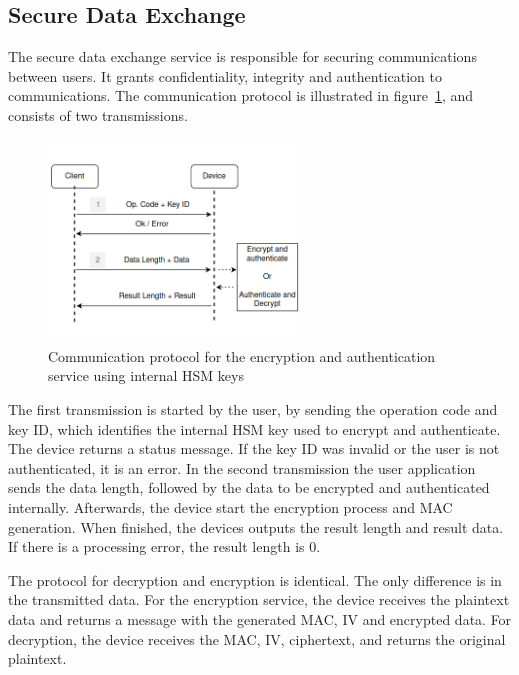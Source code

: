 \subsection{Secure Data Exchange}\label{chap:arch:services:data-exchange}

The secure data exchange service is responsible for securing communications between users. It grants confidentiality, integrity and authentication to communications.
The communication protocol is illustrated in figure~\ref{fig:protocol:data-exchange}, and consists of two transmissions.
\begin{figure}[h!]
	\centering
	\includegraphics[width=0.60\textwidth]{./Images/data-exchange.png}
	\caption{Communication protocol for the encryption and authentication service using internal HSM keys}
	\label{fig:protocol:data-exchange}
\end{figure}

The first transmission is started by the user, by sending the operation code and key ID, which identifies the internal \ac{HSM} key used to encrypt and authenticate.
The device returns a status message. If the key ID was invalid or the user is not authenticated, it is an error.
In the second transmission the user application sends the data length, followed by the data to be encrypted and authenticated internally.
Afterwards, the device start the encryption process and \ac{MAC} generation. When finished, the devices outputs the result length and result data. If there is a processing error, the result length is 0.

The protocol for decryption and encryption is identical. The only difference is in the transmitted data. For the encryption service, the device receives the plaintext data and returns a message with the generated \ac{MAC}, \ac{IV} and encrypted data. For decryption, the device receives the \ac{MAC}, \ac{IV}, ciphertext, and returns the original plaintext.

